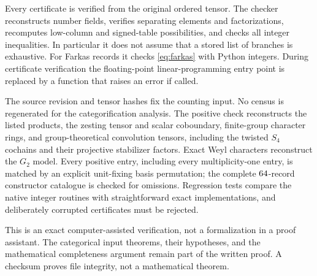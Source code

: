 Every certificate is verified from the original ordered tensor. The
checker reconstructs number fields, verifies separating elements and
factorizations, recomputes low-column and signed-table possibilities,
and checks all integer inequalities. In particular it does not assume
that a stored list of branches is exhaustive. For Farkas records it
checks \eqref{eq:farkas} with Python integers. During certificate
verification the floating-point linear-programming entry point is
replaced by a function that raises an error if called.

The source revision and tensor hashes fix the counting input. No census
is regenerated for the categorification analysis. The positive check
reconstructs the listed products, the zesting tensor and scalar
coboundary, finite-group character rings, and group-theoretical
convolution tensors, including the twisted $S_4$ cochains and their
projective stabilizer factors. Exact Weyl characters reconstruct the
$G_2$ model. Every positive entry, including every multiplicity-one
entry, is matched by an explicit unit-fixing basis permutation; the
complete $64$-record constructor catalogue is checked for omissions. Regression tests compare the native integer
routines with straightforward exact implementations, and deliberately
corrupted certificates must be rejected.

This is an exact computer-assisted verification, not a formalization in
a proof assistant. The categorical input theorems, their hypotheses,
and the mathematical completeness argument remain part of the written
proof. A checksum proves file integrity, not a mathematical theorem.

